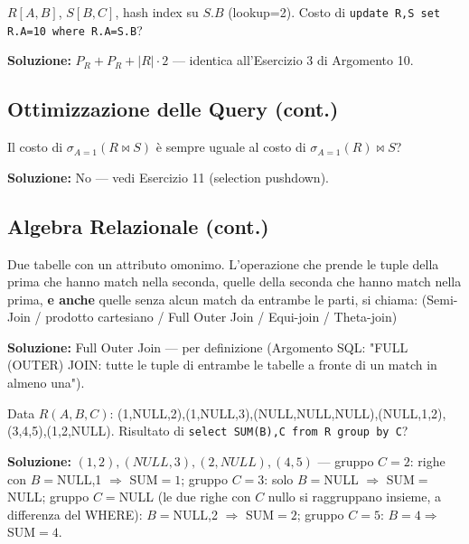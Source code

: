 \documentclass[12pt, a4paper]{article}
\begin{document}
\begin{tcolorbox}[colback=lightergray!10, colframe=tocsec, title=\textbf{Esercizio 27} (identica a quella già in Argomento 10)]
$R[A,B]$, $S[B,C]$, hash index su $S.B$ (lookup=2). Costo di \texttt{update R,S set R.A=10 where R.A=S.B}?
\end{tcolorbox}
\textbf{Soluzione:} $P_R+P_R+|R|\cdot 2$ — identica all'Esercizio 3 di Argomento 10.

\subsection{Ottimizzazione delle Query (cont.)}

\begin{tcolorbox}[colback=lightergray!10, colframe=tocsec, title=\textbf{Esercizio 28} (identica all'Esercizio 11 sopra)]
Il costo di $\sigma_{A=1}(R\bowtie S)$ è sempre uguale al costo di $\sigma_{A=1}(R)\bowtie S$?
\end{tcolorbox}
\textbf{Soluzione:} No — vedi Esercizio 11 (selection pushdown).

\subsection{Algebra Relazionale (cont.)}

\begin{tcolorbox}[colback=lightergray!10, colframe=tocsec, title=\textbf{Esercizio 29}]
Due tabelle con un attributo omonimo. L'operazione che prende le tuple della prima che hanno match nella seconda, quelle della seconda che hanno match nella prima, \textbf{e anche} quelle senza alcun match da entrambe le parti, si chiama: (Semi-Join / prodotto cartesiano / Full Outer Join / Equi-join / Theta-join)
\end{tcolorbox}
\textbf{Soluzione:} Full Outer Join — per definizione (Argomento SQL: "FULL (OUTER) JOIN: tutte le tuple di entrambe le tabelle a fronte di un match in almeno una").

\begin{tcolorbox}[colback=lightergray!10, colframe=tocsec, title=\textbf{Esercizio 30}]
Data $R(A,B,C)$: (1,NULL,2),(1,NULL,3),(NULL,NULL,NULL),(NULL,1,2),(3,4,5),(1,2,NULL). Risultato di \texttt{select SUM(B),C from R group by C}?
\end{tcolorbox}
\textbf{Soluzione:} $(1,2), (NULL,3), (2,NULL), (4,5)$ — gruppo $C{=}2$: righe con $B{=}$NULL,1 $\Rightarrow$ SUM$=1$; gruppo $C{=}3$: solo $B{=}$NULL $\Rightarrow$ SUM$=$NULL; gruppo $C{=}$NULL (le due righe con $C$ nullo si raggruppano insieme, a differenza del WHERE): $B{=}$NULL,2 $\Rightarrow$ SUM$=2$; gruppo $C{=}5$: $B{=}4\Rightarrow$SUM$=4$.
\end{document}
